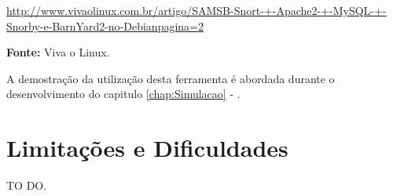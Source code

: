 \begin{itemize}
				\begin{framed}
					\href{http://www.vivaolinux.com.br/artigo/SAMSB-Snort-+-Apache2-+-MySQL-+-Snorby-e-BarnYard2-no-Debian?pagina=2}{http://www.vivaolinux.com.br/artigo/SAMSB-Snort-+-Apache2-+-MySQL-+-Snorby-e-BarnYard2-no-Debian\?pagina=2}
				\end{framed}	

				\textbf{Fonte:} Viva o Linux.

				A demostração da utilização desta ferramenta é abordada durante o desenvolvimento do capitulo \ref{chap:Simulacao} - .

			\end{itemize}

	\section{Limitações e Dificuldades}
	\label{sec:Arquitetura_Limitacoes}

		TO DO.

		